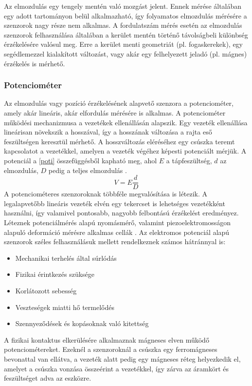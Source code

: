 Az elmozdulás egy tengely mentén való mozgást jelent. Ennek mérése általában egy adott tartományon belül alkalmazható, így folyamatos elmozdulás mérésére a szenzorok nagy része nem alkalmas. A fordulatszám mérés esetén az elmozdulás szenzorok felhasználása általában a kerület mentén történő távolságbeli különbség érzékelésére valósul meg. Erre a kerület menti geometriát (pl. fogaskerekek), egy segédlemezzel kialakított változást, vagy akár egy felhelyezett jeladó (pl. mágnes) érzékelés is mérhető.

\subsubsection{Potenciométer}
\label{linpot}

Az elmozdulás vagy pozíció érzékelésének alapvető szenzora a potenciométer, amely akár lineáris, akár elfordulás mérésére is alkalmas. 
A potenciométer működési mechanizmusa a vezetékek ellenállásán alapszik. Egy vezeték ellenállása lineárisan növekszik a hosszával, így a hosszának változása a rajta eső feszültségen keresztül mérhető. A hosszváltozás eléréséhez egy csúszka teremt kapcsolatot a vezetékkel, amelyen a vezeték végéhez képesti potenciált mérjük. A potenciál a \ref{poti} összefüggésből kapható meg, ahol $E$ a tápfeszültség, $d$ az elmozdulás, $D$ pedig a teljes elmozdulás \cite{Fraden2016a}.
\begin{equation}
	V = E \frac{d}{D}
	\label{poti}
\end{equation}
A potenciométeres szenzoroknak többféle megvalósítása is létezik. A legalapvetőbb lineáris vezeték elvén egy tekercset is lehetséges vezetékként használni, így valamivel pontosabb, nagyobb felbontású érzékelést eredményez. Léteznek potenciálmérés alapú nyomásmérő, valamint piezoelektromosságon alapuló deformáció mérésre alkalmas cellák \cite{Fraden2016a}.
Az elektromos potenciál alapú szenzorok széles felhasználásuk mellett rendelkeznek számos hátránnyal is:
\begin{itemize}
	\item Mechanikai terhelés által súrlódás
	\item Fizikai érintkezés szüksége
	\item Korlátozott sebesség
	\item Veszteségek miatti hő termelődés
	\item Szennyeződések és kopásoknak való kitettség
\end{itemize}
A fizikai kontaktus elkerülésére alkalmaznak mágneses elven működő potenciométereket. Ezeknél a szenzoroknál a csúszka egy ferromágneses bevonattal van ellátva, a vezeték alatt pedig egy mágneses réteg helyezkedik el, amelyet a csúszka vonzása összeérint a vezetékkel, így zárva az áramkört és feszültséget adva az eszközre.

